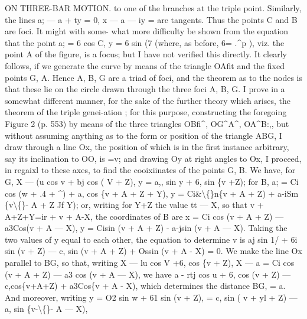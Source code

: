 \documentclass[12pt,a4paper]{article}
\begin{document}
ON THREE-BAR MOTION.
to
one
of
the
branches
at
the
triple
point.
Similarly,
the
lines
a; --- a + ty = 0,
x --- a --- iy =
are
tangents.
Thus
the
points C and B
are
foci.
It
might with
some-
what more
difficulty be
shown
from
the
equation
that the
point
a; = 6 cos C, y = 6 sin (7
(where, as
before, 6=
.\textasciicircum{}p
),
viz.
the
point A
of the
figure,
is
a
focus;
but
I
have
not
verified
this
directly.
It clearly
follows,
if we generate the
curve by means
of
the
triangle
OAfit
and
the
fixed
points
G, A.
Hence
A,
B, G
are
a
triad
of
foci,
and
the
theorem
as
to
the
nodes
is
that
these
lie
on the
circle drawn through the three
foci A, B,
G.
I
prove
in
a somewhat different manner,
for
the sake of
the
further theory which
arises, the
theorem
of the
triple genei-ation
;
for
this
purpose, constructing the foregoing
Figure
2
(p.
553)
by means
of
the
three
triangles
OBfi\textasciicircum{},
OG\textasciicircum{}A\textasciicircum{},
OA\textasciicircum{}B:,, but
without
assuming
anything
as
to
the
form
or
position
of
the
triangle ABG,
I
draw
through
a
line
Ox, the
position
of which
is
in the
first instance arbitrary, say
its inclination
to
OO,
is =v;
and
drawing
Oy at
right
angles
to
Ox,
I
proceed,
in
regaixl
to
these
axes,
to
find
the
cooixiinates of the points
G, B.
We
have,
for
G,
X --- (u cos v + bj cos ( V + Z),
y = a,, sin y + 6, sin \{v +Z);
for B,
a; = Ci cos (w + .4 + \textasciicircum{}) + a, cos \{v + A + Z + Y),
y = Ci\&\textbackslash\{\}n\{v + A + Z) + a-iSm \{v\textbackslash\{\}- A + Z Jf Y);
or, writing
for Y+Z the value
tt --- X, so that
v + A+Z+Y=ir + v + A-X,
the coordinates of B are
x = Ci cos (v + A + Z) --- a3Cos(v + A --- X),
y = Cisin (v + A + Z) - a-jsin (v + A --- X).
Taking the two
values
of y equal
to
each
other, the equation
to determine
v
is
aj sin
1/ + 6i sin (v + Z) --- c, sin (v + A + Z) + Ossin (v + A - X) = 0.
We make the
line Ox parallel
to BG, so
that, writing
X --- lu cos V
+6, cos \{v + Z),
X --- a = Ci cos (v + A + Z) --- a3 cos (v + A --- X),
we have
a - rtj cos u + 6, cos (v + Z) --- c,cos\{v+A+Z) + a3Cos\{v + A - X),
which determines the distance BG, = a.
And moreover,
writing
y = O2 sin w
+ 61 sin (v + Z),
= c, sin ( v + yl + Z) --- a, sin \{v-\textbackslash\{\}- A --- X),
\end{document}
